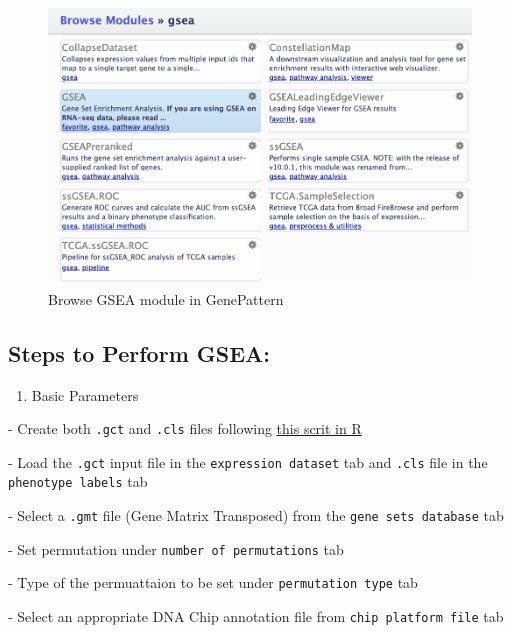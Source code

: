 \documentclass[
]{book}
\providecommand{\tightlist}{%
  \setlength{\itemsep}{0pt}\setlength{\parskip}{0pt}}
\begin{document}
\begin{figure}

{\centering \includegraphics[width=1\linewidth]{images/Browse_Modules_gsea} 

}

\caption{Browse GSEA module in GenePattern}\label{fig:unnamed-chunk-24}
\end{figure}

\hypertarget{steps-to-perform-gsea}{%
\subsection{Steps to Perform GSEA:}\label{steps-to-perform-gsea}}

\begin{enumerate}
\def\labelenumi{\arabic{enumi}.}
\tightlist
\item
  Basic Parameters
\end{enumerate}

- Create both \texttt{.gct} and \texttt{.cls} files following \href{degust.html}{this scrit in R}

- Load the \texttt{.gct} input file in the \texttt{expression\ dataset} tab and \texttt{.cls} file in the \texttt{phenotype\ labels} tab

- Select a \texttt{.gmt} file (Gene Matrix Transposed) from the \texttt{gene\ sets\ database} tab

- Set permutation under \texttt{number\ of\ permutations} tab

- Type of the permuattaion to be set under \texttt{permutation\ type} tab

- Select an appropriate DNA Chip annotation file from \texttt{chip\ platform\ file} tab
\end{document}
